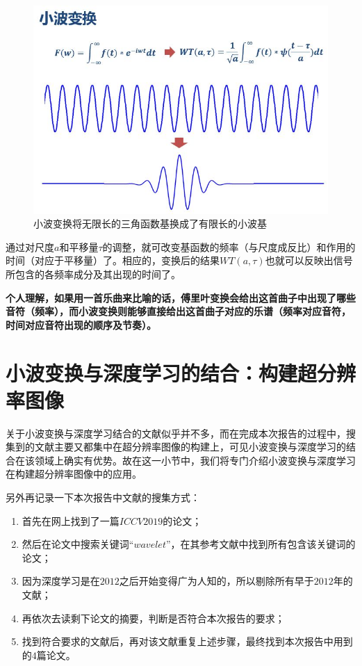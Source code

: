 \documentclass[UTF8]{ctexart}
\begin{document}
			\begin{figure}[H]
				\centering 
				\includegraphics[scale=0.6]{wavelet-base.jpg} 
				\caption{小波变换将无限长的三角函数基换成了有限长的小波基} 
				\label{wavelet base}
			\end{figure}            
            
            \indent 通过对尺度$a$和平移量$\tau$的调整，就可改变基函数的频率（与尺度成反比）和作用的时间（对应于平移量）了。相应的，变换后的结果$WT\left( a, \tau \right)$也就可以反映出信号所包含的各频率成分及其出现的时间了。
            
            \indent \textbf{个人理解，如果用一首乐曲来比喻的话，傅里叶变换会给出这首曲子中出现了哪些音符（频率），而小波变换则能够直接给出这首曲子对应的乐谱（频率对应音符，时间对应音符出现的顺序及节奏）。}
            
    \section{小波变换与深度学习的结合：构建超分辨率图像}\label{combination of WT and Deeplearning}
        
        \indent 关于小波变换与深度学习结合的文献似乎并不多，而在完成本次报告的过程中，搜集到的文献主要又都集中在超分辨率图像的构建上\cite{deng2019wavelet, zhong2018joint, huang2017wavelet, gao2016hybrid}，可见小波变换与深度学习的结合在该领域上确实有优势。故在这一小节中，我们将专门介绍小波变换与深度学习在构建超分辨率图像中的应用。
   
        \indent 另外再记录一下本次报告中文献的搜集方式：
        
    			\begin{enumerate}[leftmargin=50pt]
    				\item 首先在网上找到了一篇$ICCV2019$的论文；
    				\item 然后在论文中搜索关键词“$wavelet$”，在其参考文献中找到所有包含该关键词的论文；
    				\item 因为深度学习是在$2012$之后开始变得广为人知的，所以剔除所有早于$2012$年的文献；
    				\item 再依次去读剩下论文的摘要，判断是否符合本次报告的要求；
    				\item 找到符合要求的文献后，再对该文献重复上述步骤，最终找到本次报告中用到的$4$篇论文。
    			\end{enumerate}
        
\end{document}
